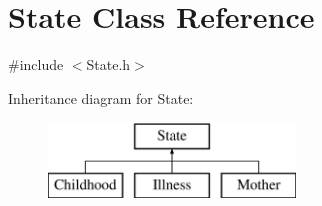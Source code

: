 \hypertarget{class_state}{}\section{State Class Reference}
\label{class_state}


{\ttfamily \#include $<$State.\+h$>$}

Inheritance diagram for State\+:\begin{figure}[H]
\begin{center}
\leavevmode
\includegraphics[height=2.000000cm]{class_state}
\end{center}
\end{figure}

